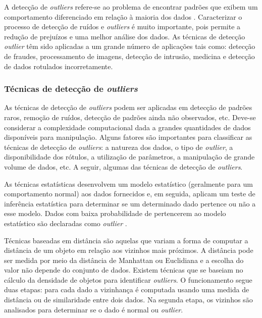 A detecção de \textit{outliers} refere-se ao problema de encontrar padrões que exibem um comportamento diferenciado em relação à maioria dos dados \cite{chandola2009}. Caracterizar o processo de detecção de ruídos e \textit{outliers} é muito importante, pois permite a redução de prejuízos e uma melhor análise dos dados. As técnicas de detecção \textit{outlier} têm sido aplicadas a um grande número de aplicações tais como: detecção de fraudes, processamento de imagens, detecção de intrusão, medicina e detecção de dados rotulados incorretamente.

\subsubsection{Técnicas de detecção de \textit{outliers}}
As técnicas de detecção de \textit{outliers} podem ser aplicadas em detecção de padrões raros, remoção de ruídos, detecção de padrões ainda não observados, etc. Deve-se considerar a complexidade computacional dada a grandes quantidades de dados disponíveis para manipulação. Alguns fatores são importantes para classificar as técnicas de detecção de \textit{outliers}: a natureza dos dados, o tipo de \textit{outlier}, a disponibilidade dos rótulos, a utilização de parâmetros, a manipulação de grande volume de dados, etc. A seguir, algumas das técnicas de detecção de \textit{outliers}.

As técnicas estatísticas desenvolvem um modelo estatístico (geralmente para um comportamento normal) aos dados fornecidos e, em seguida, aplicam um teste de inferência estatística para determinar se um determinado dado pertence ou não a esse modelo. Dados com baixa probabilidade de pertencerem ao modelo estatístico são declaradas como \textit{outlier} \cite{chandola2009}.

Técnicas baseadas em distância são aquelas que variam a forma de computar a distância de um objeto em relação aos vizinhos mais próximos. A distância pode ser medida por meio da distância de Manhattan ou Euclidiana e a escolha do valor não depende do conjunto de dados. Existem técnicas que se baseiam no cálculo da densidade de objetos para identificar \textit{outliers}. O funcionamento segue duas etapas: para cada dado a vizinhança é computada usando uma medida de distância ou de similaridade entre dois dados. Na segunda etapa, os vizinhos são analisados para determinar se o dado é normal ou \textit{outlier}.

